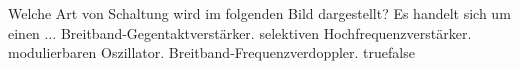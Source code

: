     {Welche Art von Schaltung wird im folgenden Bild dargestellt? Es handelt sich um einen ...}
    {Breitband-Gegentaktverstärker.}
    {selektiven Hochfrequenzverstärker.}
    {modulierbaren Oszillator.}
    {Breitband-Frequenzverdoppler.}
    {true}{false}